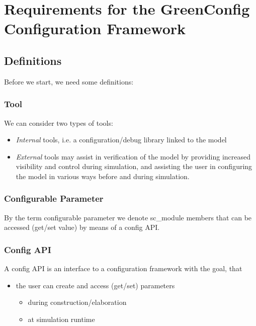 
\section{Requirements for the GreenConfig Configuration Framework}
\label{requirements}

\subsection{Definitions}Before we start, we need some definitions: 


\subsubsection{Tool}
We can consider two types of tools: 

\begin{itemize}
	\item {\em Internal} tools, i.e. a configuration/debug library linked to the model  
	\item {\em External} tools may assist in verification of the model by providing increased visibility and control during simulation, and assisting the user in configuring the model in various ways before and during simulation. 
\end{itemize}


\subsubsection{Configurable Parameter}
By the term configurable parameter we denote sc\_module members that can be accessed (get/set value) by means of a config API.  


\subsubsection{Config API}A config API is an interface to a configuration framework with the goal, that  

\begin{itemize}
	\item the user can create and access (get/set) parameters 
	\begin{itemize}
		\item during construction/elaboration 
		\item at simulation runtime 
	\end{itemize}
\end{itemize}

